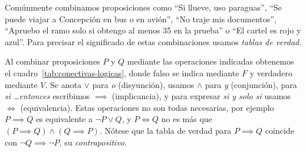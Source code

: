   Comúnmente combinamos proposiciones como
  ``Si llueve, uso paraguas'',
  ``Se puede viajar a Concepción en bus o en avión'',
  ``No traje mis documentos'',
  ``Apruebo el ramo solo si obtengo al menos 35 en la prueba''
  o ``El cartel es rojo y azul''.
  Para precisar el significado de estas combinaciones
  usamos \emph{tablas de verdad}.
  \begin{table}[htbp]
    \centering
    \hspace*{4em}
    \caption{Tablas de verdad para conectivas básicas}
    \label{tab:conectivas-logicas}
  \end{table}
  Al combinar proposiciones \(P\) y \(Q\)
  mediante las operaciones indicadas
  obtenemos el cuadro~\ref{tab:conectivas-logicas},
  donde falso se indica mediante \(F\)
  y verdadero mediante \(V\).
  Se anota \(\vee\) para \emph{o}
  (disyunción),
  usamos \(\wedge\) para \emph{y}
  (conjunción),
  para \emph{si \ldots entonces} escribimos \(\implies\)
  (implicancia),%
  y para expresar \emph{si y solo si} usamos \(\iff\)
  (equivalencia).%
  Estas operaciones no son todas necesarias,
  por ejemplo \(P \implies Q\)
  es equivalente a \(\neg P \vee Q\),
  y \(P \iff Q\) no es más que
  \((P \implies Q) \wedge (Q \implies P)\).
  Nótese que la tabla de verdad para \(P \implies Q\)
  coincide con \(\neg Q \implies \neg P\),
  su \emph{contrapositivo}.%

